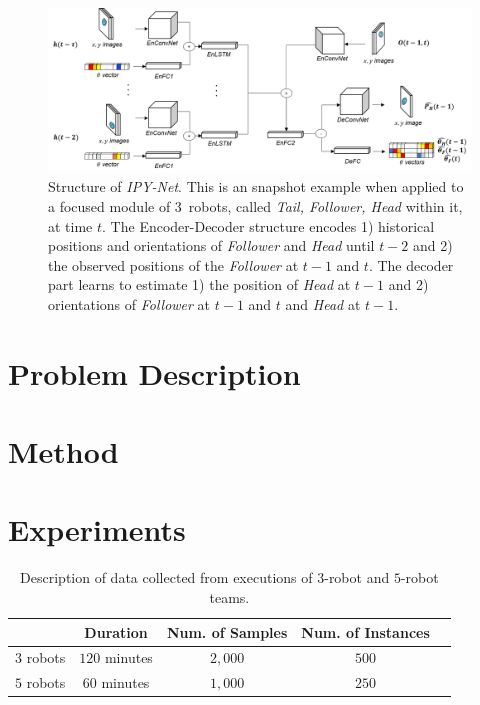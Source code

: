 \documentclass[letterpaper, 10 pt, conference]{ieeeconf}  %
\begin{document}
	\begin{figure}\centering
		\includegraphics[width=1.8\columnwidth]{fig_DL_Pipeline}
		\caption{Structure of \emph{IPY-Net}. This is an snapshot example when applied to a focused module of
			$3$~robots, called \emph{Tail, Follower, Head} within it, at time $t$. 
			The Encoder-Decoder structure encodes
			1) historical positions and orientations of \emph{Follower} and \emph{Head} 
			until $t-2$ and 2) the observed positions of the \emph{Follower} at $t-1$ and $t$. 
			The decoder part learns to estimate 1) the position of \emph{Head} at $t-1$ and 
			2) orientations of \emph{Follower} at $t-1$ and $t$ and \emph{Head} at $t-1$.   
		}
		\label{fig:DL_Pipeline}
	\end{figure}
	
	\section{Problem Description} 
	\label{sec:problem_description}
	
	\section{Method}
	\label{sec:method}
	
	
	\section{Experiments} 
	\label{sec:experiments} 
	
	
	\begin{table}[]
		\label{table:data_description}
		\begin{tabular}{|c|c|c|c|c|}
			\hline
						&  Duration & Num. of Samples & Num. of Instances  \\ \hline
			$3$ robots & $120$ minutes & $2,000$ & $500$  \\ \hline
			$5$ robots & $60$ minutes  & $1,000$ & $250$  \\ \hline
		\end{tabular}
		\caption{Description of data collected from executions of $3$-robot and $5$-robot teams.}
	\end{table}
	
\end{document}
